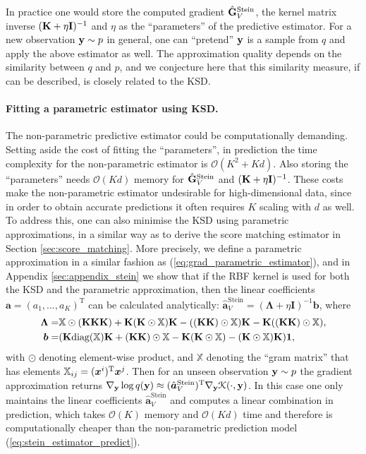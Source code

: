 %
In practice one would store the computed gradient $\hat{\mathbf{G}}_{V}^{\text{Stein}}$, the kernel matrix inverse $(\mathbf{K} + \eta \mathbf{I})^{-1}$ and $\eta$ as the ``parameters'' of the predictive estimator.
%
For a new observation $\mathbf{y} \sim p$ in general, one can ``pretend'' $\mathbf{y}$ is a sample from $q$ and apply the above estimator as well. The approximation quality depends on the similarity between $q$ and $p$, and we conjecture here that this similarity measure, if can be described, is closely related to the KSD.
 
\paragraph{Fitting a parametric estimator using KSD.}
The non-parametric predictive estimator could be computationally demanding. Setting aside the cost of fitting the ``parameters'', in prediction the time complexity for the non-parametric estimator is $\mathcal{O}(K^2 + Kd)$. Also storing the ``parameters'' needs $\mathcal{O}(Kd)$ memory for $\hat{\mathbf{G}}_{V}^{\text{Stein}}$ and $(\mathbf{K} + \eta \mathbf{I})^{-1}$. These costs make the non-parametric estimator undesirable for high-dimensional data, since in order to obtain accurate predictions it often requires $K$ scaling with $d$ as well. To address this, one can also minimise the KSD using parametric approximations, in a similar way as to derive the score matching estimator in Section \ref{sec:score_matching}. 
%
More precisely, we define a parametric approximation in a similar fashion as (\ref{eq:grad_parametric_estimator}), and in Appendix \ref{sec:appendix_stein} we show that if the RBF kernel is used for both the KSD and the parametric approximation, then the linear coefficients $\bm{a} = (a_1, ..., a_K)^{\text{T}}$ can be calculated analytically: $\hat{\bm{a}}_{V}^{\text{Stein}} = (\bm{\Lambda} + \eta \mathbf{I})^{-1} \bm{b}$, where
\begin{equation}
\begin{aligned}
\bm{\Lambda} =& \mathbb{X} \odot (\mathbf{K} \mathbf{K} \mathbf{K}) + \mathbf{K} (\mathbf{K} \odot \mathbb{X}) \mathbf{K} - ((\mathbf{K}\mathbf{K}) \odot \mathbb{X}) \mathbf{K} - \mathbf{K} ((\mathbf{K}\mathbf{K}) \odot \mathbb{X}), \\
\bm{b} =& ( \mathbf{K} \text{diag}(\mathbb{X}) \mathbf{K} + (\mathbf{K} \mathbf{K}) \odot \mathbb{X} - \mathbf{K} (\mathbf{K} \odot \mathbb{X}) - (\mathbf{K} \odot \mathbb{X}) \mathbf{K} ) \bm{1},
\end{aligned}
\end{equation}
%
with $\odot$ denoting element-wise product, and $\mathbb{X}$ denoting the ``gram matrix'' that has elements $\mathbb{X}_{ij} = (\bm{x}^i)^{\text{T}} \bm{x}^j$. Then for an unseen observation $\mathbf{y} \sim p$ the gradient approximation returns $\nabla_{\mathbf{y}} \log q(\mathbf{y}) \approx (\hat{\bm{a}}^{\text{Stein}}_{V})^{\text{T}} \nabla_{\mathbf{y}} \mathcal{K}(\cdot, \mathbf{y})$. In this case one only maintains the linear coefficients $\hat{\bm{a}}^{\text{Stein}}_{V}$ and computes a linear combination in prediction, which takes $\mathcal{O}(K)$ memory and $\mathcal{O}(Kd)$ time and therefore is computationally cheaper than the non-parametric prediction model (\ref{eq:stein_estimator_predict}).


